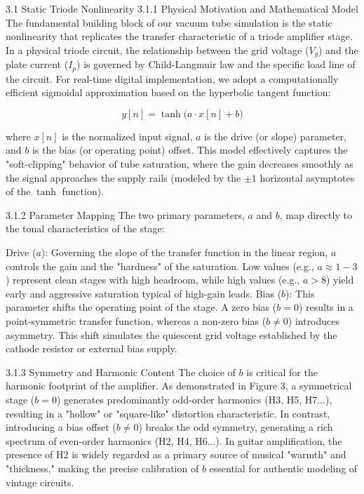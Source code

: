 3.1 Static Triode Nonlinearity
3.1.1 Physical Motivation and Mathematical Model
The fundamental building block of our vacuum tube simulation is the static nonlinearity that replicates the transfer characteristic of a triode amplifier stage. In a physical triode circuit, the relationship between the grid voltage ($V_g$) and the plate current ($I_p$) is governed by Child-Langmuir law and the specific load line of the circuit. For real-time digital implementation, we adopt a computationally efficient sigmoidal approximation based on the hyperbolic tangent function:

$$ y[n] = \tanh\bigl(a \cdot x[n] + b\bigr) \tag{10} $$

where $x[n]$ is the normalized input signal, $a$ is the drive (or slope) parameter, and $b$ is the bias (or operating point) offset. This model effectively captures the "soft-clipping" behavior of tube saturation, where the gain decreases smoothly as the signal approaches the supply rails (modeled by the $\pm 1$ horizontal asymptotes of the $\tanh$ function).

3.1.2 Parameter Mapping
The two primary parameters, $a$ and $b$, map directly to the tonal characteristics of the stage:

Drive ($a$): Governing the slope of the transfer function in the linear region, $a$ controls the gain and the "hardness" of the saturation. Low values (e.g., $a \approx 1{-}3$) represent clean stages with high headroom, while high values (e.g., $a > 8$) yield early and aggressive saturation typical of high-gain leads.
Bias ($b$): This parameter shifts the operating point of the stage. A zero bias ($b = 0$) results in a point-symmetric transfer function, whereas a non-zero bias ($b \neq 0$) introduces asymmetry. This shift simulates the quiescent grid voltage established by the cathode resistor or external bias supply.

3.1.3 Symmetry and Harmonic Content
The choice of $b$ is critical for the harmonic footprint of the amplifier. As demonstrated in Figure 3, a symmetrical stage ($b=0$) generates predominantly odd-order harmonics (H3, H5, H7...), resulting in a "hollow" or "square-like" distortion characteristic. In contrast, introducing a bias offset ($b \neq 0$) breaks the odd symmetry, generating a rich spectrum of even-order harmonics (H2, H4, H6...). In guitar amplification, the presence of H2 is widely regarded as a primary source of musical "warmth" and "thickness," making the precise calibration of $b$ essential for authentic modeling of vintage circuits.

